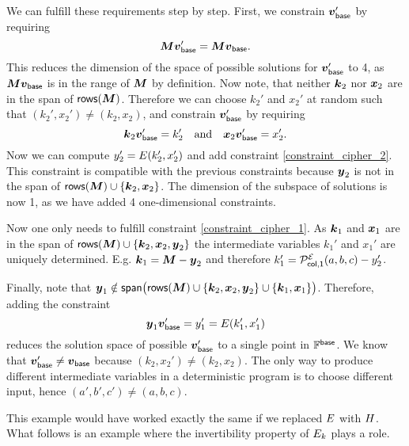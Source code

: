 We can fulfill these requirements step by step.
First, we constrain $\vbase'$ by requiring 
\[
    \M \vbase' = \M \vbase.
\]
This reduces the dimension of the space of possible solutions for $\vbase'$ to 4,
as $\M \vbase$ is in the range of $\M$ by definition.
Now note, that neither $\vk_2$ nor $\vx_2$ are in the span of $\rows(\M)$.
Therefore we can choose $k_2'$ and $x_2'$ at random such that $(k_2', x_2') \neq (k_2, x_2)$,
and constrain $\vbase'$ by requiring
\[
    \vk_2 \vbase' = k_2' \quad \textrm{and} \quad \vx_2 \vbase' = x_2'.
\]
Now we can compute $y_2' = \E(k_2', x_2')$ and add constraint \eqref{constraint_cipher_2}.
This constraint is compatible with the previous constraints because $\vy_2$ is not in the span of
$\rows(\M) \cup \{\vk_2, \vx_2\}$.
The dimension of the subspace of solutions is now 1, as we have added 4 one-dimensional constraints.

Now one only needs to fulfill constraint \eqref{constraint_cipher_1}.
As $\vk_1$ and $\vx_1$ are in the span of
$\rows(\M) \cup \{\vk_2, \vx_2, \vy_2\}$ the intermediate variables $k_1'$ and $x_1'$ are uniquely determined.
E.g. $\vk_1 = \M - \vy_2$ and therefore $k_1' = \PE[col,1](a,b,c) - y_2'$.

Finally, note that 
$\vy_1 \notin \spn\big( \rows(\M) \cup \{ \vk_2, \vx_2, \vy_2 \} \cup \{ \vk_1, \vx_1 \} \big)$.
Therefore, adding the constraint
\[
    \vy_1 \vbase' = y_1' = \E(k_1', x_1')
\]
reduces the solution space of possible $\vbase'$ to a single point in $\Base$.
We know that $\vbase' \neq \vbase$ because $(k_2, x_2') \neq (k_2, x_2)$.
The only way to produce different intermediate variables in a deterministic program is to choose different input,
hence $(a',b',c') \neq (a,b,c)$.

This example would have worked exactly the same if we replaced $\E$ with $\H$.
What follows is an example where the invertibility property of $\E_k$ plays a role.

